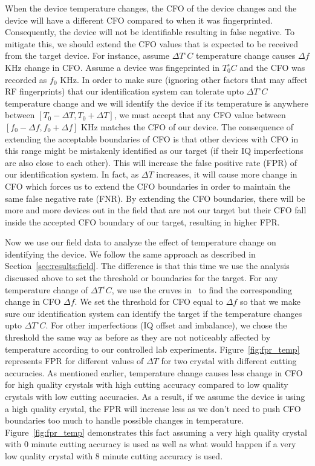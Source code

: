 When the device temperature changes, the CFO of the device changes and the device will have a different CFO compared to when it was fingerprinted. Consequently, the device will not be identifiable resulting in false negative. To mitigate this, we should extend the CFO values that is expected to be received from the target device. For instance, assume  $\Delta T  ^\circ C$ temperature change causes $\Delta f$ KHz change in CFO. Assume a device was fingeprinted in $T_0 ^\circ C$ and the CFO was recorded as $f_0$ KHz. In order to make sure (ignoring other factors that may affect RF fingerprints) that our identification system can tolerate upto $\Delta T ^\circ C$ temperature change and we will identify the device if its temperature is anywhere between  $[T_0-\Delta T, T_0+\Delta T]$, we must accept that any CFO value between $[f_0-\Delta f, f_0+\Delta f]$ KHz matches the CFO of our device. The consequence of extending the acceptable boundaries of CFO is that other devices with CFO in this range might be mistakenly identified as our target (if their IQ imperfections are also close to each other). This will increase the false positive rate (FPR) of our identification system. In fact, as $\Delta T$ increases, it will cause more change in CFO which forces us to extend the CFO boundaries in order to maintain the same false negative rate (FNR). By extending the CFO boundaries, there will be more and more devices out in the field that are not our target but their CFO fall inside the accepted CFO boundary of our target, resulting in higher FPR.

Now we use our field data to analyze the effect of temperature change on identifying the device. We follow the same approach as described in Section~\ref{sec:results:field}. The difference is that this time we use the analysis discussed above to set the threshold or boundaries for the target. For any temperature change of $\Delta T  ^\circ C$, we use the cruves in~\cite{temp_cfo1} to find the corresponding change in CFO $\Delta f$. We set the threshold for CFO equal to $\Delta f$ so that we make sure our identification system can identify the target if the temperature changes upto $\Delta T  ^\circ C$. For other imperfections (IQ offset and imbalance), we chose the threshold the same way as before as they are not noticeably affected by temperature according to our controlled lab experiments. Figure~\ref{fig:fpr_temp} represents FPR for different values of $\Delta T$ for two crystal with different cutting accuracies. As mentioned earlier, temperature change causes less change in CFO for high quality crystals with high cutting accuracy compared to low quality crystals with low cutting accuracies. As a result, if we assume the device is using a high quality crystal, the FPR will increase less as we don't need to push CFO boundaries too much to handle possible changes in temperature. Figure~\ref{fig:fpr_temp} demonstrates this fact assuming a very high quality crystal with 0 minute cutting accuracy is used as well as what would happen if a very low quality crystal with 8 minute cutting accuracy is used. 

